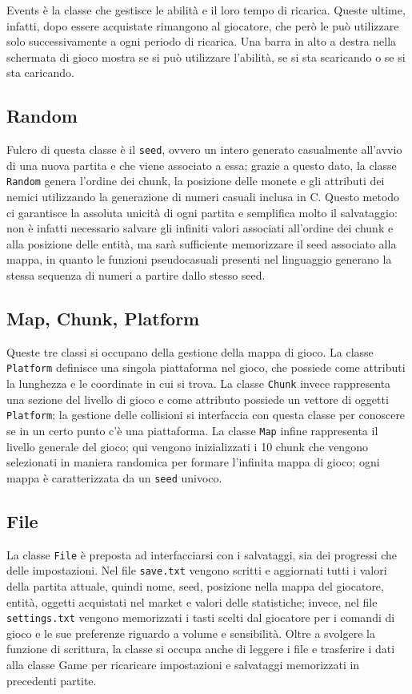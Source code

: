 \documentclass[a4paper]{article}
\def\CC{{C\nolinebreak[4]\hspace{-.05em}\raisebox{.4ex}{\tiny\bf ++}}}
\begin{document}
Events è la classe che gestisce le abilità e il loro tempo di ricarica. Queste
ultime, infatti, dopo essere acquistate rimangono al giocatore, che però le può
utilizzare solo successivamente a ogni periodo di ricarica. Una barra in alto a
destra nella schermata di gioco mostra se si può utilizzare l'abilità, se si sta
scaricando o se si sta caricando.


\subsection{Random}
Fulcro di questa classe è il \texttt{seed}, ovvero un intero generato 
casualmente all'avvio di una nuova partita e che viene associato a essa; grazie 
a questo dato, la classe \texttt{Random} genera l'ordine dei chunk, la posizione 
delle monete e gli attributi dei nemici utilizzando la generazione di numeri 
casuali inclusa in \CC. Questo metodo ci garantisce la assoluta unicità di ogni 
partita e semplifica molto il salvataggio: non è infatti necessario salvare gli
infiniti valori associati all'ordine dei chunk e alla posizione delle entità, ma 
sarà sufficiente memorizzare il seed associato alla mappa, in quanto le funzioni 
pseudocasuali presenti nel linguaggio generano la stessa sequenza di numeri a 
partire dallo stesso seed.

\subsection{Map, Chunk, Platform}
Queste tre classi si occupano della gestione della mappa di gioco. La classe 
\texttt{Platform} definisce una singola piattaforma nel gioco, che possiede come 
attributi la lunghezza e le coordinate in cui si trova. La classe \texttt{Chunk} 
invece rappresenta una sezione del livello di gioco e come attributo possiede 
un vettore di oggetti \texttt{Platform}; la gestione delle collisioni si 
interfaccia con questa classe per conoscere se in un certo punto c'è una 
piattaforma. La classe \texttt{Map} infine rappresenta il livello generale del 
gioco; qui vengono inizializzati i 10 chunk che vengono selezionati in maniera 
randomica per formare l'infinita mappa di gioco; ogni mappa è caratterizzata da 
un \texttt{seed} univoco.

\subsection{File}
La classe \texttt{File} è preposta ad interfacciarsi con i salvataggi, sia dei 
progressi che delle impostazioni. Nel file \texttt{save.txt} vengono scritti e 
aggiornati tutti i valori della partita attuale, quindi nome, seed, posizione 
nella mappa del giocatore, entità, oggetti acquistati nel market e valori delle 
statistiche; invece, nel file \texttt{settings.txt} vengono memorizzati i tasti
scelti dal giocatore per i comandi di gioco e le sue preferenze riguardo a 
volume e sensibilità. Oltre a svolgere la funzione di scrittura, la classe si 
occupa anche di leggere i file e trasferire i dati alla classe Game per 
ricaricare impostazioni e salvataggi memorizzati in precedenti partite.
\end{document}
